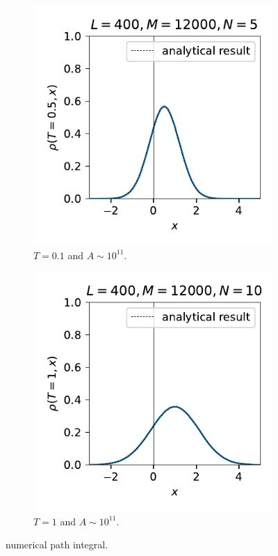 \documentclass[10pt, a4paper]{article}
\numberwithin{equation}{section}
\begin{document}
\begin{itemize}
		\begin{figure}[H]
			\centering
			\begin{subfigure}{0.4\linewidth}
				\centering
				\includegraphics[scale=0.8]{figures/numerical path integral (normalized) of a free particle with initial state as a Gaussian wave packet and T=0.5 (L=400, M=12000, N=5).pdf}
				\caption{$T = 0.1$ and $A \sim 10^{11}$.}
			\end{subfigure}
			\begin{subfigure}{0.4\linewidth}
				\centering
				\includegraphics[scale=0.8]{figures/numerical path integral (normalized) of a free particle with initial state as a Gaussian wave packet and T=1 (L=400, M=12000, N=10).pdf}
				\caption{$T = 1$ and $A \sim 10^{11}$.}
			\end{subfigure}
			\caption{numerical path integral.}
		\end{figure}
	\end{itemize}
\end{document}
